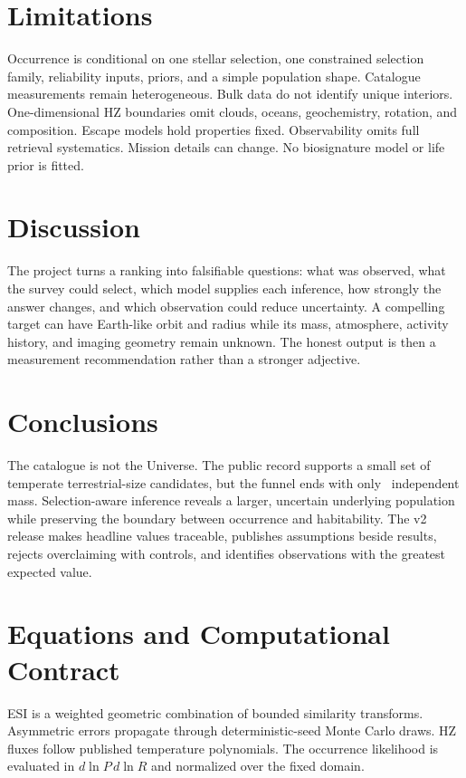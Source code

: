 \documentclass[11pt]{article}
\begin{document}
\section{Limitations}
Occurrence is conditional on one stellar selection, one constrained selection
family, reliability inputs, priors, and a simple population shape. Catalogue
measurements remain heterogeneous. Bulk data do not identify unique interiors.
One-dimensional HZ boundaries omit clouds, oceans, geochemistry, rotation, and
composition. Escape models hold properties fixed. Observability omits full
retrieval systematics. Mission details can change. No biosignature model or life
prior is fitted.

\section{Discussion}
The project turns a ranking into falsifiable questions: what was observed, what
the survey could select, which model supplies each inference, how strongly the
answer changes, and which observation could reduce uncertainty. A compelling
target can have Earth-like orbit and radius while its mass, atmosphere, activity
history, and imaging geometry remain unknown. The honest output is then a
measurement recommendation rather than a stronger adjective.

\section{Conclusions}
The catalogue is not the Universe. The public record supports a small set of
temperate terrestrial-size candidates, but the funnel ends with only
\SmallHZMeasuredMass\ independent mass. Selection-aware inference reveals a
larger, uncertain underlying population while preserving the boundary between
occurrence and habitability. The v2 release makes headline values traceable,
publishes assumptions beside results, rejects overclaiming with controls, and
identifies observations with the greatest expected value.

\appendix
\section{Equations and Computational Contract}
ESI is a weighted geometric combination of bounded similarity transforms.
Asymmetric errors propagate through deterministic-seed Monte Carlo draws. HZ
fluxes follow published temperature polynomials. The occurrence likelihood is
evaluated in $d\ln P\,d\ln R$ and normalized over the fixed domain.
\end{document}
